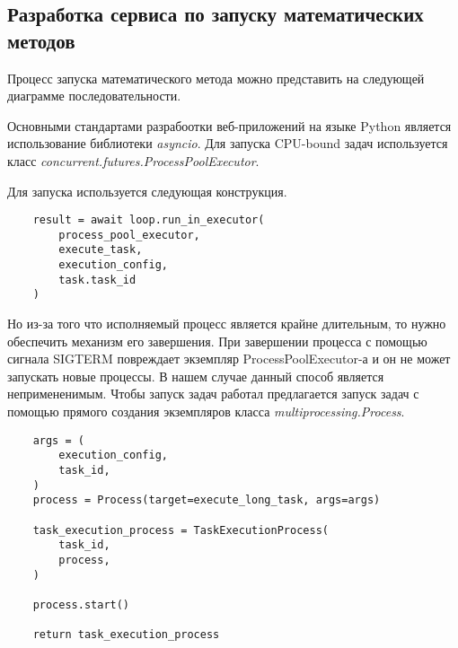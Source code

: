\subsection{\large{Разработка сервиса по запуску математических методов}}


Процесс запуска математического метода можно представить на следующей диаграмме последовательности.






Основными стандартами разрабоотки веб-приложений на языке Python является использование
библиотеки \textit{asyncio}. Для запуска CPU-bound задач используется класс
\textit{concurrent.futures.ProcessPoolExecutor}.

Для запуска используется следующая конструкция.

\begin{lstlisting}
    result = await loop.run_in_executor(
        process_pool_executor,
        execute_task,
        execution_config,
        task.task_id
    )
\end{lstlisting}

Но из-за того что исполняемый процесс является крайне длительным, то нужно обеспечить механизм его завершения.
При завершении процесса с помощью сигнала SIGTERM повреждает экземпляр ProcessPoolExecutor-а и он не может 
запускать новые процессы. В нашем случае данный способ является непримененимым. Чтобы запуск задач работал
предлагается запуск задач с помощью прямого создания экземпляров класса \textit{multiprocessing.Process}.

\begin{lstlisting}
    args = (
        execution_config,
        task_id,
    )
    process = Process(target=execute_long_task, args=args)

    task_execution_process = TaskExecutionProcess(
        task_id,
        process,
    )

    process.start()

    return task_execution_process
\end{lstlisting}
